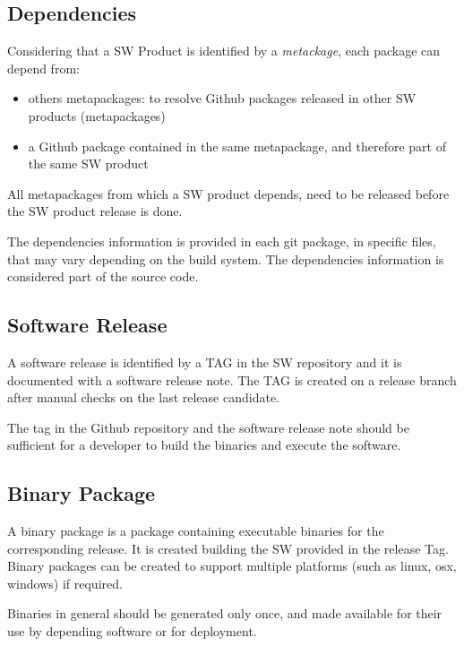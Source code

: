 \subsection{Dependencies} \label{sect:dependencies}

Considering that a SW Product is identified by a \textit{metackage}, each package can depend from:

\begin{itemize}
\item others metapackages: to resolve Github packages released in other SW products (metapackages)
\item a Github package contained in the same metapackage, and therefore part of the same SW product
\end{itemize}

All metapackages from which a SW product depends, need to be released before the SW product release is done.

The dependencies information is provided in each git package, in specific files, that may vary depending on the build system.
The dependencies information is considered part of the source code.


\subsection{Software Release} \label{sect:swrel}

A software release is identified by a TAG in the SW repository and it is documented with a software release note.
The TAG is created on a release branch after manual checks on the last release candidate.

The tag in the Github repository and the software release note should be sufficient for a developer 
to build the binaries and execute the software.


\subsection{Binary Package} \label{sect:swbpkg}

A binary package is a package containing executable binaries for the corresponding release.
It is created building the SW provided in the release Tag. 
Binary packages can be created to support multiple platforms (such as linux, osx, windows) if required.

Binaries in general should be generated only once, and made available for their use by depending software or for deployment.

